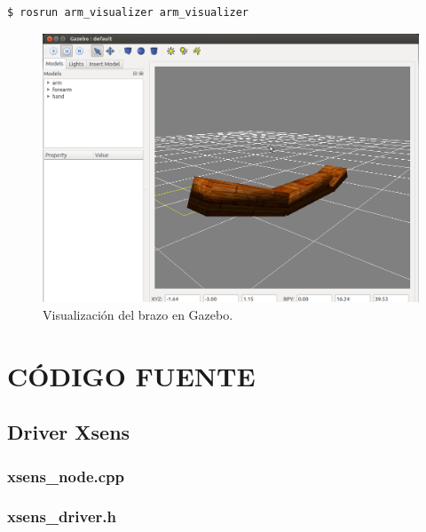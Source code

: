 \documentclass[12pt, a4paper]{report}
\begin{document}
\begin{enumerate}
\begin{verbatim}
$ rosrun arm_visualizer arm_visualizer
\end{verbatim}

\begin{figure}
	\centering
		\includegraphics[scale=0.4]{../img/gazebo_arm.png} 
	\caption[Visualización del brazo en Gazebo]{Visualización del brazo en Gazebo.} 
	\label{fig: gazebo_arm}
\end{figure}

\end{enumerate} 

\iffalse

\chapter{CÓDIGO FUENTE}

\section{Driver Xsens}

\subsection{xsens\_node.cpp}
\lstset{inputencoding=utf8/latin1}

\newpage

\subsection{xsens\_driver.h}
\lstset{inputencoding=utf8/latin1}

\newpage
\end{document}
